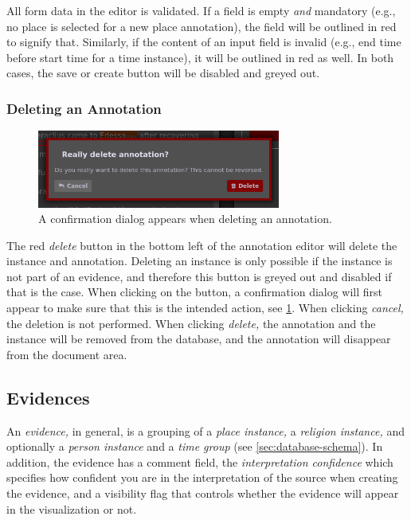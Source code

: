 All form data in the editor is validated.
If a field is empty \emph{and} mandatory (e.g., no place is selected for a new place annotation), the field will be outlined in red to signify that.
Similarly, if the content of an input field is invalid (e.g., end time before start time for a time instance), it will be outlined in red as well.
In both cases, the save or create button will be disabled and greyed out.


\subsubsection{Deleting an Annotation}
\label{sec:annotation-deletion}

\begin{figure}[htb]
  \centering
  \includegraphics[width=8cm]{../src/assets/annotator-documentation/delete-annotation.png}

  \caption{
    A confirmation dialog appears when deleting an annotation.
  }
  \label{fig:delete-annotation}
\end{figure}

The red \emph{delete} button in the bottom left of the annotation editor will delete the instance and annotation.
Deleting an instance is only possible if the instance is not part of an evidence, and therefore this button is greyed out and disabled if that is the case.
When clicking on the button, a confirmation dialog will first appear to make sure that this is the intended action, see \cref{fig:delete-annotation}.
When clicking \emph{cancel,} the deletion is not performed.
When clicking \emph{delete,} the annotation and the instance will be removed from the database, and the annotation will disappear from the document area.


\subsection{Evidences}
\label{sec:annotator-evidences}

An \emph{evidence,} in general, is a grouping of a \emph{place instance,} a \emph{religion instance,} and optionally a \emph{person instance} and a \emph{time group} (see \cref{sec:database-schema}).
In addition, the evidence has a comment field, the \emph{interpretation confidence} which specifies how confident you are in the interpretation of the source when creating the evidence, and a visibility flag that controls whether the evidence will appear in the visualization or not.

